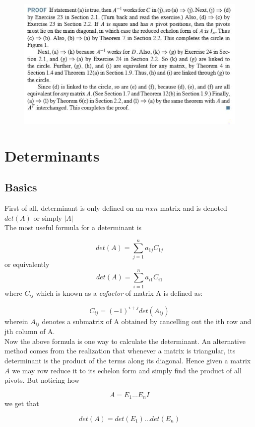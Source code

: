 \documentclass{article}
\numberwithin{equation}{subsection}
\begin{document}
\clearpage

\begin{figure}[H]
    \centering
    \includegraphics{epflSemesterOne/linearAlgebra/figures/proof.JPG}

\end{figure}

\section{Determinants}
\subsection{Basics}

First of all, determinant is only defined on an $nxn$ matrix and is denoted $det(A)$ or simply $|A|$
\\
The most useful formula for a determinant is 

$$ det(A) = \sum_{j=1}^{n} a_{1j}C_{1j}$$ or equivalently 
$$ det(A) = \sum_{i=1}^{n} a_{i1}C_{i1}$$
where $C_{ij}$ which is known as a \textit{cofactor} of matrix A is defined as:

$$ C_{ij} = (-1)^{i+j}det(A_{ij})$$ wherein $A_{ij}$ denotes a submatrix of A obtained by cancelling out the ith row and jth column of A. 
\\
Now the above formula is one way to calculate the determinant. An alternative method comes from the realization that whenever a matrix is triangular, its determinant is the product of the terms along its diagonal. Hence given a matrix $A$ we may row reduce it to its echelon form and simply find the product of all pivots. But noticing how 

$$ A = E_{1}\ldots E_{n}I$$ we get that

$$det(A) = det(E_{1})\ldots det(E_{n})$$
\end{document}
